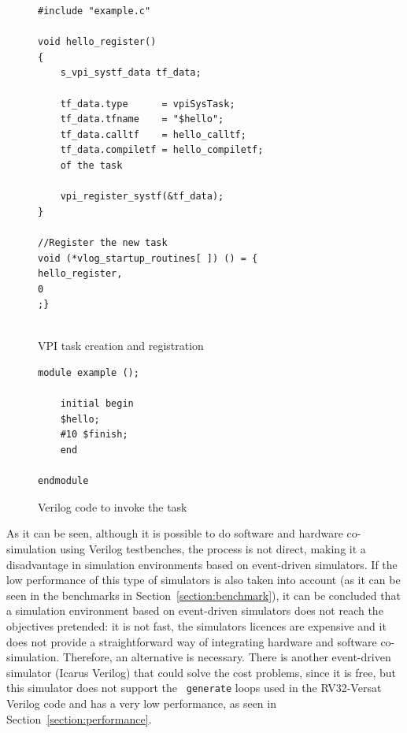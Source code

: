 \documentclass[conference]{IEEEtran}
\begin{document}
\lstset{language=C}
\lstset{basicstyle=\scriptsize}
\begin{figure}[!htb]
\begin{minipage}{\linewidth}
\begin{lstlisting}[frame=single]
#include "example.c"

void hello_register()
{
	s_vpi_systf_data tf_data;
	
	tf_data.type      = vpiSysTask;
	tf_data.tfname    = "$hello";
	tf_data.calltf    = hello_calltf;
	tf_data.compiletf = hello_compiletf;
	of the task
	
	vpi_register_systf(&tf_data);
}

//Register the new task
void (*vlog_startup_routines[ ]) () = {
hello_register,
0
;}
			
\end{lstlisting}
\end{minipage}
\caption{VPI task creation and registration}
\label{fig:vpi_routine}
\end{figure}

\lstset{language=Verilog}
\begin{figure}[!htb]
\begin{minipage}{\linewidth}
\begin{lstlisting}[frame=single]
module example ();

	initial begin
	$hello;
	#10 $finish;
	end

endmodule
\end{lstlisting}
\end{minipage}
\caption{Verilog code to invoke the task}
\label{fig:vpi_verilog}
\end{figure}
\lstset{basicstyle=\normalsize}

As it can be seen, although it is possible to do software and hardware
co-simulation using Verilog testbenches, the process is not direct, making it a
disadvantage in simulation environments based on event-driven simulators. If the
low performance of this type of simulators is also taken into account (as it can
be seen in the benchmarks in Section~\ref{section:benchmark}), it can be
concluded that a simulation environment based on event-driven simulators does
not reach the objectives pretended: it is not fast, the simulators licences are
expensive and it does not provide a straightforward way of integrating hardware
and software co-simulation. Therefore, an alternative is necessary.  There is
another event-driven simulator (Icarus Verilog) that could solve the cost
problems, since it is free, but this simulator does not support the {\tt
	generate} loops used in the RV32-Versat Verilog code and has a very low
performance, as seen in Section~\ref{section:performance}.
\end{document}
